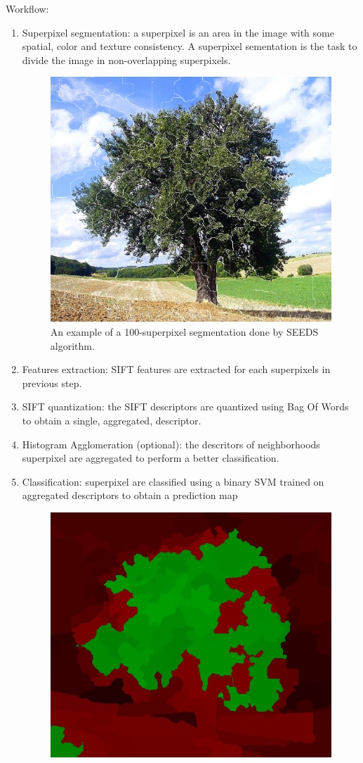 \documentclass[a4paper,titlepaget]{article}
\begin{document}
\noindent Workflow:
\begin{enumerate}
	\item Superpixel segmentation: a superpixel is an area in the image with some spatial, color and texture consistency. A superpixel sementation is the task to divide the image in non-overlapping superpixels.
	\begin{figure}[htpb]
		\centering
		\includegraphics[width=.6\textwidth]{images/superpixel_segmentation}
		\caption{\centering An example of a 100-superpixel segmentation done by
        SEEDS algorithm.}
	\end{figure}
	\item Features extraction: SIFT features are extracted for each superpixels
        in previous step.
	\item SIFT quantization: the SIFT descriptors are quantized using Bag Of Words to obtain a
        single, aggregated, descriptor.
    \item Histogram Agglomeration (optional): the descritors of neighborhoods superpixel are aggregated
        to perform a better classification.
    \item Classification: superpixel are classified using a binary SVM trained on aggregated
        descriptors to obtain a prediction map
	\begin{figure}[htpb]
		\centering
		\includegraphics[width=.6\textwidth]{images/prediction_map}

\end{figure}
\end{enumerate}
\end{document}
